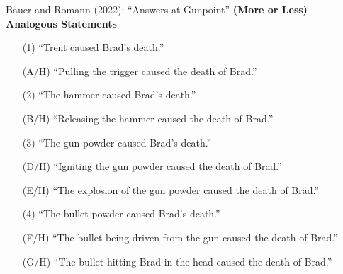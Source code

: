 \documentclass[xcolor=table,9pt,aspectratio=169]{beamer}
\begin{document}
\begin{frame}{\vspace*{10mm}Bauer and Romann (2022): ``Answers at Gunpoint''}
\vspace*{-5mm}
\textbf{(More or Less) Analogous Statements}\\
\begin{itemize}
   \item[(1)] ``Trent caused Brad's death.''
   \item[(A/H)] ``Pulling the trigger caused the death of Brad.''
\end{itemize}
\vspace*{0.5em}
\begin{itemize}
   \item[(2)] ``The hammer caused Brad's death.''
   \item[(B/H)] ``Releasing the hammer caused the death of Brad.''
\end{itemize}
\vspace*{0.5em}
\begin{itemize}
   \item[(3)] ``The gun powder caused Brad's death.''
   \item[(D/H)] ``Igniting the gun powder caused the death of Brad.''
   \item[(E/H)] ``The explosion of the gun powder caused the death of Brad.''
\end{itemize}
\vspace*{0.5em}
\begin{itemize}
   \item[(4)] ``The bullet powder caused Brad's death.''
   \item[(F/H)] ``The bullet being driven from the gun caused the death of Brad.''
   \item[(G/H)] ``The bullet hitting Brad in the head caused the death of Brad.''
\end{itemize}
\end{frame}
\end{document}
